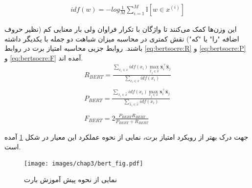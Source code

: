 \begin{align} \label{eq:idf}
idf(w) = -log \frac{1}{M} \sum_{i=1}^{M} \mathbb{I}[w \in x^{(i)}]
\end{align}

 این وزن‌ها کمک می‌کنند تا واژگان با تکرار فراوان ولی بار معنایی کم (نظیر حروف اضافه "را" یا "که") نقش کمتری در محاسبه میزان شباهت دو جمله با یکدیگر داشته باشند. روابط جزیی محاسبه امتیاز برت در روابط 
\ref{eq:bertsocre:R}
و
\ref{eq:bertsocre:P}
و
\ref{eq:bertsocre:F}
آمده اند.
\begin{align}\label{eq:bertsocre:R}
R_{BERT} = \frac{
\sum_{x_i \in x}^{} idf(x_i) \max_{\hat{x}_j \in \hat{x} } \mathbf{x}_i^\intercal \mathbf{\hat{x}}_j
}
{\sum_{x_i \in x}^{} idf(x_i) } \\ \nonumber \\ \label{eq:bertsocre:P} 
P_{BERT} = \frac{
	\sum_{x_i \in \hat{x}}^{} idf(x_i) \max_{x_j \in x } \mathbf{x}_i^\intercal \mathbf{\hat{x}}_j
}
{\sum_{\hat{x}_i \in \hat{x}}^{} idf(x_i) } \\ \nonumber \\ \label{eq:bertsocre:F} 
F_{BERT} = 2 \frac{P_{BERT} \dot{R_{BERT}}}{P_{BERT}+R_{BERT}}
\end{align}

جهت درک بهتر از رویکرد امتیاز برت، نمایی از نحوه عملکرد این معیار در شکل 
\ref{fig:chap3:bertscore}
آمده است.

 \begin{figure}[h]
	\centering
	\texttt{[image: images/chap3/bert\_fig.pdf]}
	\caption{
		نمایی از نحوه پیش آموزش بارت
	}
	\label{fig:chap3:bertscore}
\end{figure}

